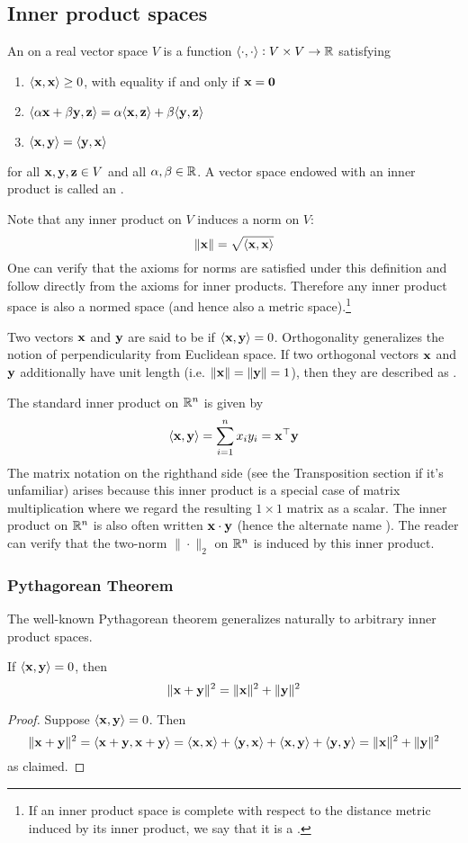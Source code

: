 \subsection{Inner product spaces}
An  on a real vector space $V$ is a function $\langle \cdot, \cdot \rangle : V \times V \to \mathbb{R}$ satisfying
\begin{enumerate}
\item $\langle \mathbf{x}, \mathbf{x} \rangle \geq 0$, with equality if and only if $\mathbf{x} = \mathbf{0}$
\item $\langle \alpha\mathbf{x} + \beta\mathbf{y}, \mathbf{z} \rangle = \alpha\langle \mathbf{x}, \mathbf{z} \rangle + \beta\langle \mathbf{y}, \mathbf{z} \rangle$
\item $\langle \mathbf{x}, \mathbf{y} \rangle = \langle \mathbf{y}, \mathbf{x} \rangle$
\end{enumerate}
for all $\mathbf{x}, \mathbf{y}, \mathbf{z} \in V$ and all $\alpha,\beta \in \mathbb{R}$.
A vector space endowed with an inner product is called an .

Note that any inner product on $V$ induces a norm on $V$:
\[\|\mathbf{x}\| = \sqrt{\langle \mathbf{x}, \mathbf{x} \rangle}\]
One can verify that the axioms for norms are satisfied under this definition and follow directly from the axioms for inner products.
Therefore any inner product space is also a normed space (and hence also a metric space).\footnote{
    If an inner product space is complete with respect to the distance metric induced by its inner product, we say that it is a .
}

Two vectors $\mathbf{x}$ and $\mathbf{y}$ are said to be  if $\langle \mathbf{x}, \mathbf{y} \rangle = 0$.
Orthogonality generalizes the notion of perpendicularity from Euclidean space.
If two orthogonal vectors $\mathbf{x}$ and $\mathbf{y}$ additionally have unit length (i.e. $\|\mathbf{x}\| = \|\mathbf{y}\| = 1$), then they are described as .

The standard inner product on $\mathbb{R}^n$ is given by
\[\langle \mathbf{x}, \mathbf{y} \rangle = \sum_{i=1}^n x_iy_i = \mathbf{x}^\top\mathbf{y}\]
The matrix notation on the righthand side (see the Transposition section if it's unfamiliar) arises because this inner product is a special case of matrix multiplication where we regard the resulting $1 \times 1$ matrix as a scalar.
The inner product on $\mathbb{R}^n$ is also often written $\mathbf{x}\cdot\mathbf{y}$ (hence the alternate name ).
The reader can verify that the two-norm $\|\cdot\|_2$ on $\mathbb{R}^n$ is induced by this inner product.

\subsubsection{Pythagorean Theorem}
The well-known Pythagorean theorem generalizes naturally to arbitrary inner product spaces.
\begin{theorem}
If $\langle \mathbf{x}, \mathbf{y} \rangle = 0$, then
\[\|\mathbf{x}+\mathbf{y}\|^2 = \|\mathbf{x}\|^2 + \|\mathbf{y}\|^2\]
\end{theorem}
\begin{proof}
Suppose $\langle \mathbf{x}, \mathbf{y} \rangle = 0$. Then
\[\|\mathbf{x}+\mathbf{y}\|^2 = \langle \mathbf{x}+\mathbf{y}, \mathbf{x}+\mathbf{y} \rangle = \langle \mathbf{x}, \mathbf{x} \rangle + \langle \mathbf{y}, \mathbf{x} \rangle + \langle \mathbf{x}, \mathbf{y} \rangle + \langle \mathbf{y}, \mathbf{y} \rangle = \|\mathbf{x}\|^2 + \|\mathbf{y}\|^2\]
as claimed.
\end{proof}


